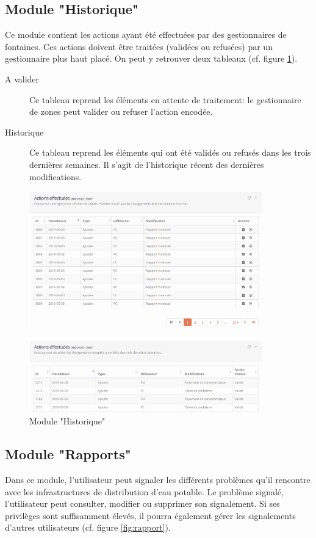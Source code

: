\documentclass{EPL-master-thesis-covers-FR}
\begin{document}
			
			\subsection*{Module "Historique"}
			\label{sec:historique}
				Ce module contient les actions ayant été effectuées par des gestionnaires de fontaines. Ces actions doivent être traitées (validées ou refusées) par un gestionnaire plus haut placé. On peut y retrouver deux tableaux (cf. figure \ref{fig:historique}).
				\begin{description}
					\item[A valider] Ce tableau reprend les éléments en attente de traitement: le gestionnaire de zones peut valider ou refuser l'action encodée.
					\item[Historique] Ce tableau reprend les éléments qui ont été validés ou refusés dans les trois dernières semaines. Il s'agit de l'historique récent des dernières modifications.
				\end{description}
				\begin{figure}[H]
					\centering
					\includegraphics[width=0.9\textwidth]{images/logs}
					\caption{Module "Historique"}
					\label{fig:historique}
				\end{figure}
				
			
			\subsection*{Module "Rapports"}
				Dans ce module, l'utilisateur peut signaler les différents problèmes qu'il rencontre avec les infrastructures de distribution d'eau potable. Le problème signalé, l'utilisateur peut consulter, modifier ou supprimer son signalement. Si ses privilèges sont suffisamment élevés, il pourra également gérer les signalements d'autres utilisateurs (cf. figure \ref{fig:rapport}).
				
\end{document}
